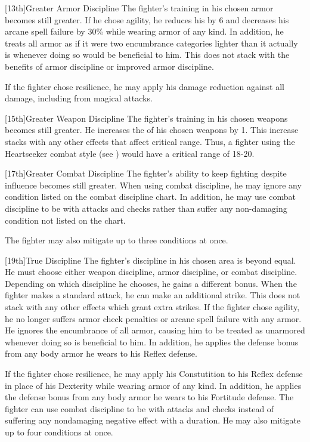 [13th]{Greater Armor Discipline}
The fighter's training in his chosen armor becomes still greater.
If he chose agility, he reduces his  by 6 and decreases his arcane spell failure by 30\% while wearing armor of any kind.
In addition, he treats all armor as if it were two encumbrance categories lighter than it actually is whenever doing so would be beneficial to him.
This does not stack with the benefits of armor discipline or improved armor discipline.

If the fighter chose resilience, he may apply his damage reduction against all damage, including from magical attacks.

[15th]{Greater Weapon Discipline}
The fighter's training in his chosen weapons becomes still greater.
He increases the  of his chosen weapons by 1.
This increase stacks with any other effects that affect critical range.
Thus, a fighter using the Heartseeker combat style (see ) would have a critical range of 18-20.

[17th]{Greater Combat Discipline}
The fighter's ability to keep fighting despite influence becomes still greater.
When using combat discipline, he may ignore any condition listed on the combat discipline chart.
In addition, he may use combat discipline to be \severelyimpaired with attacks and checks rather than suffer any non-damaging condition not listed on the chart.

\par The fighter may also mitigate up to three conditions at once.

[19th]{True Discipline}
The fighter's discipline in his chosen area is beyond equal.
He must choose either weapon discipline, armor discipline, or combat discipline.
Depending on which discipline he chooses, he gains a different bonus.
    When the fighter makes a standard attack, he can make an additional strike.
    This does not stack with any other effects which grant extra strikes.
    If the fighter chose agility, he no longer suffers armor check penalties or arcane spell failure with any armor.
    He ignores the encumbrance of all armor, causing him to be treated as unarmored whenever doing so is beneficial to him.
    In addition, he applies the defense bonus from any body armor he wears to his Reflex defense.

    If the fighter chose resilience, he may apply his Constutition to his Reflex defense in place of his Dexterity while wearing armor of any kind.
    In addition, he applies the defense bonus from any body armor he wears to his Fortitude defense.
    The fighter can use combat discipline to be \impaired with attacks and checks instead of suffering any nondamaging negative effect with a duration.
    He may also mitigate up to four conditions at once.

